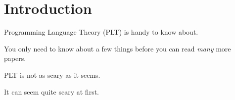 
\section{Introduction}

\begin{frame}[c]
  Programming Language Theory (PLT) is handy to know about.
\end{frame}

\begin{frame}[c]
  You only need to know about a few things before you can read {\it many} more papers.
\end{frame}

\begin{frame}[c]
  PLT is not as scary as it seems.
\end{frame}

\begin{frame}[c]
  It can seem quite scary at first.
\end{frame}

